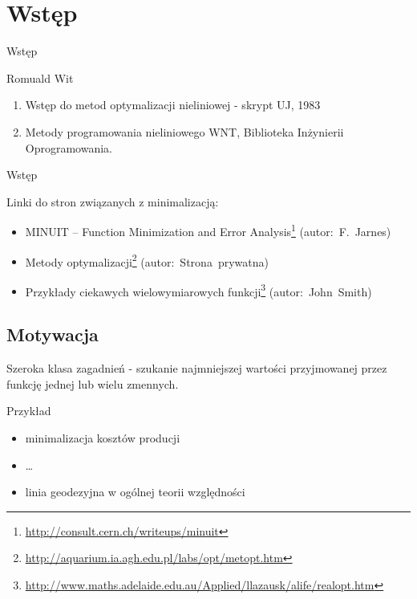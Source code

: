 \section{Wstęp}

  \begin{frame}{Wstęp}
    \begin{block}{Romuald Wit}
      \begin{enumerate}
        \item Wstęp do metod optymalizacji nieliniowej - skrypt
        UJ, 1983
        \item Metody programowania nieliniowego WNT, Biblioteka
        Inżynierii Oprogramowania.
      \end{enumerate}
    \end{block}

  \end{frame}

  \begin{frame}{Wstęp}
    \begin{block}{Linki do stron związanych z minimalizacją:}
      \begin{itemize}
        \item MINUIT -- Function Minimization and Error
        Analysis\footnote{\url{http://consult.cern.ch/writeups/minuit}}
        (autor:~F.~Jarnes)
        \item Metody optymalizacji\footnote{\url{http://aquarium.ia.agh.edu.pl/labs/opt/metopt.htm}}
        (autor:~Strona~prywatna)
        \item Przykłady ciekawych wielowymiarowych
        funkcji\footnote{\url{http://www.maths.adelaide.edu.au/Applied/llazausk/alife/realopt.htm}}
        (autor:~John~Smith)
      \end{itemize}
    \end{block}

  \end{frame}

\subsection{Motywacja}

  \begin{frame}
    Szeroka klasa zagadnień - szukanie najmniejszej wartości
    przyjmowanej przez funkcję jednej lub wielu zmennych.

    \begin{exampleblock}{Przykład}
      \begin{itemize}
        \item minimalizacja kosztów producji
        \item \ldots
        \item linia geodezyjna w ogólnej teorii względności
      \end{itemize}
    \end{exampleblock}

  \end{frame}

